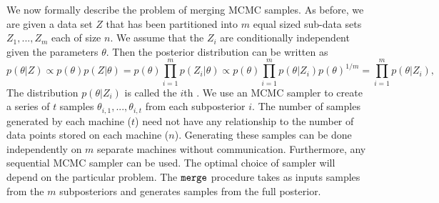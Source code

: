 \documentclass[thesis.tex]{subfiles}
\newcommand{\merge}{\mkprocedure{merge}}
\newcommand\sample[2]{\theta_{{#1},{#2}}}
\begin{document}
We now formally describe the problem of merging MCMC samples.
As before, we are given a data set $Z$ that has been partitioned into $m$ equal sized sub-data sets $Z_1,...,Z_m$ each of size $n$.
We assume that the $Z_i$ are conditionally independent given the parameters $\theta$.
Then the posterior distribution can be written as
\begin{equation}
    \label{eq:mcmc:ptz}
    p(\theta|Z) 
    \propto p(\theta)p(Z|\theta)
    = p(\theta)\prod_{i=1}^m p(Z_i|\theta)
    \propto p(\theta)\prod_{i=1}^m p(\theta|Z_i)p(\theta)^{1/m}
    = \prod_{i=1}^m p(\theta|Z_i)
    ,
\end{equation}
The distribution $p(\theta|Z_i)$ is called the $i$th .
We use an MCMC sampler to create a series of $t$ samples $\sample{i}{1},...,\sample{i}{t}$ from each subposterior $i$.
The number of samples generated by each machine ($t$) need not have any relationship to the number of data points stored on each machine ($n$).
Generating these samples can be done independently on $m$ separate machines without communication.
Furthermore, any sequential MCMC sampler can be used.
The optimal choice of sampler will depend on the particular problem.
The $\merge$ procedure takes as inputs samples from the $m$ subposteriors and generates samples from the full posterior.
\end{document}
